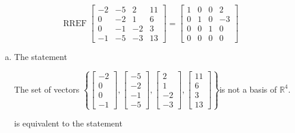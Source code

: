 \begin{exerciseAnswer} 


\[\operatorname{RREF} \left[\begin{array}{cccc}
-2 & -5 & 2 & 11 \\
0 & -2 & 1 & 6 \\
0 & -1 & -2 & 3 \\
-1 & -5 & -3 & 13
\end{array}\right] = \left[\begin{array}{cccc}
1 & 0 & 0 & 2 \\
0 & 1 & 0 & -3 \\
0 & 0 & 1 & 0 \\
0 & 0 & 0 & 0
\end{array}\right] \]


\begin{enumerate}[(a)]
\item The statement 
\begin{center}\begin{minipage}{0.8\textwidth}
 The set of vectors \( \left\{ \left[\begin{array}{c}
-2 \\
0 \\
0 \\
-1
\end{array}\right] , \left[\begin{array}{c}
-5 \\
-2 \\
-1 \\
-5
\end{array}\right] , \left[\begin{array}{c}
2 \\
1 \\
-2 \\
-3
\end{array}\right] , \left[\begin{array}{c}
11 \\
6 \\
3 \\
13
\end{array}\right] \right\} \)is not a basis of \(\mathbb{R}^4\). 
\end{minipage}\end{center}
     is equivalent to the statement 
\begin{center}\begin{minipage}{0.8\textwidth}
 The set of vectors \( \left\{ \left[\begin{array}{c}
-2 \\
0 \\

\end{array}
\end{minipage}
\end{center}
\end{enumerate}
\end{exerciseAnswer}
